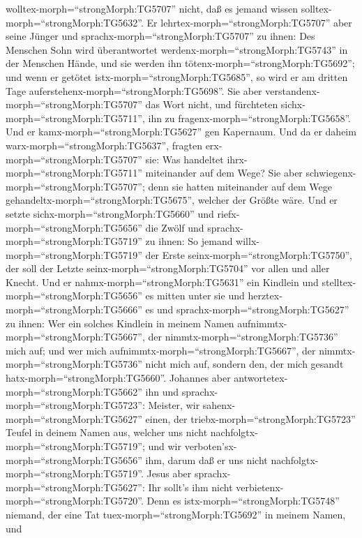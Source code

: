 wolltex-morph=``strongMorph:TG5707'' nicht, daß es jemand wissen
solltex-morph=``strongMorph:TG5632''.  Er
lehrtex-morph=``strongMorph:TG5707'' aber seine Jünger und
sprachx-morph=``strongMorph:TG5707'' zu ihnen: Des Menschen Sohn wird
überantwortet werdenx-morph=``strongMorph:TG5743'' in der Menschen
Hände, und sie werden ihn tötenx-morph=``strongMorph:TG5692''; und wenn
er getötet istx-morph=``strongMorph:TG5685'', so wird er am dritten Tage
auferstehenx-morph=``strongMorph:TG5698''.  Sie aber
verstandenx-morph=``strongMorph:TG5707'' das Wort nicht, und fürchteten
sichx-morph=``strongMorph:TG5711'', ihn zu
fragenx-morph=``strongMorph:TG5658''.  Und er
kamx-morph=``strongMorph:TG5627'' gen Kapernaum. Und da er daheim
warx-morph=``strongMorph:TG5637'', fragten
erx-morph=``strongMorph:TG5707'' sie: Was handeltet
ihrx-morph=``strongMorph:TG5711'' miteinander auf dem Wege?
 Sie aber schwiegenx-morph=``strongMorph:TG5707''; denn sie
hatten miteinander auf dem Wege gehandeltx-morph=``strongMorph:TG5675'',
welcher der Größte wäre.  Und er setzte
sichx-morph=``strongMorph:TG5660'' und
riefx-morph=``strongMorph:TG5656'' die Zwölf und
sprachx-morph=``strongMorph:TG5719'' zu ihnen: So jemand
willx-morph=``strongMorph:TG5719'' der Erste
seinx-morph=``strongMorph:TG5750'', der soll der Letzte
seinx-morph=``strongMorph:TG5704'' vor allen und aller Knecht.
 Und er nahmx-morph=``strongMorph:TG5631'' ein Kindlein und
stelltex-morph=``strongMorph:TG5656'' es mitten unter sie und
herztex-morph=``strongMorph:TG5666'' es und
sprachx-morph=``strongMorph:TG5627'' zu ihnen:  Wer ein
solches Kindlein in meinem Namen aufnimmtx-morph=``strongMorph:TG5667'',
der nimmtx-morph=``strongMorph:TG5736'' mich auf; und wer mich
aufnimmtx-morph=``strongMorph:TG5667'', der
nimmtx-morph=``strongMorph:TG5736'' nicht mich auf, sondern den, der
mich gesandt hatx-morph=``strongMorph:TG5660''.  Johannes
aber antwortetex-morph=``strongMorph:TG5662'' ihn und
sprachx-morph=``strongMorph:TG5723'': Meister, wir
sahenx-morph=``strongMorph:TG5627'' einen, der
triebx-morph=``strongMorph:TG5723'' Teufel in deinem Namen aus, welcher
uns nicht nachfolgtx-morph=``strongMorph:TG5719''; und wir
verboten'sx-morph=``strongMorph:TG5656'' ihm, darum daß er uns nicht
nachfolgtx-morph=``strongMorph:TG5719''.  Jesus aber
sprachx-morph=``strongMorph:TG5627'': Ihr sollt's ihm nicht
verbietenx-morph=``strongMorph:TG5720''. Denn es
istx-morph=``strongMorph:TG5748'' niemand, der eine Tat
tuex-morph=``strongMorph:TG5692'' in meinem Namen, und
